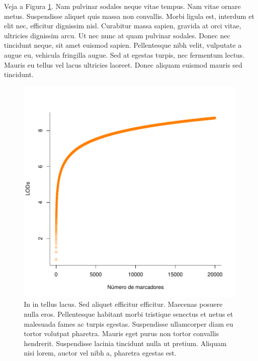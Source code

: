 \documentclass[book,A4paper,10pt,twoside,oldfontcommands]{memoir}\usepackage[]{graphicx}\usepackage[usenames,dvipsnames]{color}
\newenvironment{knitrout}{}{} %
\begin{document}
\begin{btUnit}
Veja a Figura \ref{fig:fig1}. Nam pulvinar sodales neque vitae tempus.
Nam vitae ornare metus. Suspendisse aliquet quis massa non convallis.
Morbi ligula est, interdum et elit nec, efficitur dignissim nisl.
Curabitur massa sapien, gravida at orci vitae, ultricies dignissim arcu.
Ut nec nunc at quam pulvinar sodales. Donec nec tincidunt neque, sit
amet euismod sapien. Pellentesque nibh velit, vulputate a augue eu,
vehicula fringilla augue. Sed at egestas turpis, nec fermentum lectus.
Mauris eu tellus vel lacus ultricies laoreet. Donec aliquam euismod
mauris sed tincidunt.


\begin{knitrout}
\color{fgcolor}\begin{figure}[htp]

{\centering \includegraphics[width=0.35\linewidth]{figuras/graphical_model} 

}

\caption[In in tellus lacus]{In in tellus lacus. Sed aliquet efficitur efficitur. Maecenas posuere nulla eros. Pellentesque habitant morbi tristique senectus et netus et malesuada fames ac turpis egestas. Suspendisse ullamcorper diam eu tortor volutpat pharetra. Mauris eget purus non tortor convallis hendrerit. Suspendisse lacinia tincidunt nulla ut pretium. Aliquam nisi lorem, auctor vel nibh a, pharetra egestas est.}\label{fig:fig1}
\end{figure}



\end{knitrout}
\end{btUnit}
\end{document}
